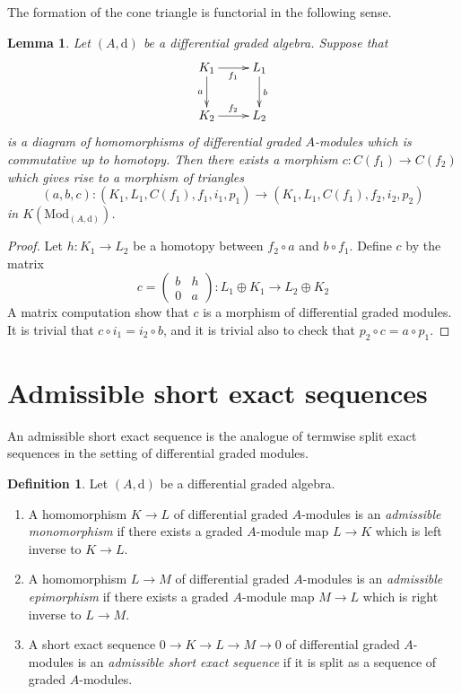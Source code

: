 \documentclass{stacks-project}
\theoremstyle{plain}
\newtheorem{lemma}[subsection]{Lemma}
\theoremstyle{definition}
\newtheorem{definition}[subsection]{Definition}
\theoremstyle{remark}
\numberwithin{equation}{subsection}
\begin{document}
\noindent
The formation of the cone triangle is functorial in the following sense.

\begin{lemma}
\label{lemma-functorial-cone}
Let $(A, \text{d})$ be a differential graded algebra.
Suppose that
$$
\xymatrix{
K_1 \ar[r]_{f_1} \ar[d]_a & L_1 \ar[d]^b \\
K_2 \ar[r]^{f_2} & L_2
}
$$
is a diagram of homomorphisms of differential graded $A$-modules which is
commutative up to homotopy.
Then there exists a morphism $c : C(f_1) \to C(f_2)$ which gives rise to
a morphism of triangles
$$
(a, b, c) : (K_1, L_1, C(f_1), f_1, i_1, p_1) \to
(K_1, L_1, C(f_1), f_2, i_2, p_2)
$$
in $K(\text{Mod}_{(A, \text{d})})$.
\end{lemma}

\begin{proof}
Let $h : K_1 \to L_2$ be a homotopy between $f_2 \circ a$ and $b \circ f_1$.
Define $c$ by the matrix
$$
c =
\left(
\begin{matrix}
b & h \\
0 & a
\end{matrix}
\right) :
L_1 \oplus K_1 \to L_2 \oplus K_2
$$
A matrix computation show that $c$ is a morphism of differential
graded modules. It is trivial that $c \circ i_1 = i_2 \circ b$, and it is
trivial also to check that $p_2 \circ c = a \circ p_1$.
\end{proof}











\section{Admissible short exact sequences}
\label{section-admissible}

\noindent
An admissible short exact sequence is the analogue of termwise split exact
sequences in the setting of differential graded modules.

\begin{definition}
\label{definition-admissible-ses}
Let $(A, \text{d})$ be a differential graded algebra.
\begin{enumerate}
\item A homomorphism $K \to L$ of differential graded $A$-modules
is an {\it admissible monomorphism} if there exists a graded $A$-module
map $L \to K$ which is left inverse to $K \to L$.
\item A homomorphism $L \to M$ of differential graded $A$-modules
is an {\it admissible epimorphism} if there exists a graded $A$-module
map $M \to L$ which is right inverse to $L \to M$.
\item A short exact sequence $0 \to K \to L \to M \to 0$ of differential
graded $A$-modules is an {\it admissible short exact sequence}
if it is split as a sequence of graded $A$-modules.
\end{enumerate}
\end{definition}
\end{document}
